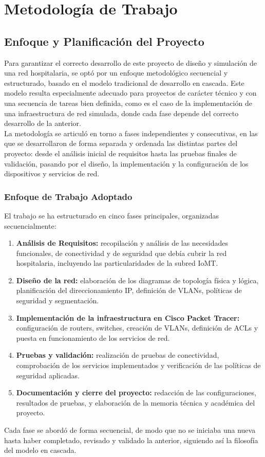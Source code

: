 
\chapter{Metodología de Trabajo}\label{Metodología}


\section{Enfoque y Planificación del Proyecto}
Para garantizar el correcto desarrollo de este proyecto de diseño y simulación de una red hospitalaria, se optó por un enfoque metodológico secuencial y estructurado, 
basado en el modelo tradicional de desarrollo en cascada. Este modelo resulta especialmente adecuado para proyectos de carácter técnico y con una secuencia de tareas 
bien definida, como es el caso de la implementación de una infraestructura de red simulada, donde cada fase depende del correcto desarrollo de la anterior.\\

La metodología se articuló en torno a fases independientes y consecutivas, en las que se desarrollaron de forma separada y ordenada las distintas partes del proyecto: 
desde el análisis inicial de requisitos hasta las pruebas finales de validación, pasando por el diseño, la implementación y la configuración de los dispositivos y servicios 
de red.

\subsection{Enfoque de Trabajo Adoptado}
El trabajo se ha estructurado en cinco fases principales, organizadas secuencialmente:
\begin{enumerate}
    \item \textbf{Análisis de Requisitos:} recopilación y análisis de las necesidades funcionales, de conectividad y de seguridad que debía cubrir la red hospitalaria, 
    incluyendo las particularidades de la subred IoMT.
    \item \textbf{Diseño de la red:} elaboración de los diagramas de topología física y lógica, planificación del direccionamiento IP, definición de VLANs, políticas de 
    seguridad y segmentación.
    \item \textbf{Implementación de la infraestructura en Cisco Packet Tracer:} configuración de routers, switches, creación de VLANs, definición de ACLs y puesta en 
    funcionamiento de los servicios de red.
    \item \textbf{Pruebas y validación:} realización de pruebas de conectividad, comprobación de los servicios implementados y verificación de las políticas de seguridad aplicadas.
    \item \textbf{Documentación y cierre del proyecto:} redacción de las configuraciones, resultados de pruebas, y elaboración de la memoria técnica y académica del proyecto.
\end{enumerate}
Cada fase se abordó de forma secuencial, de modo que no se iniciaba una nueva hasta haber completado, revisado y validado la anterior, siguiendo así la filosofía del modelo en cascada.

